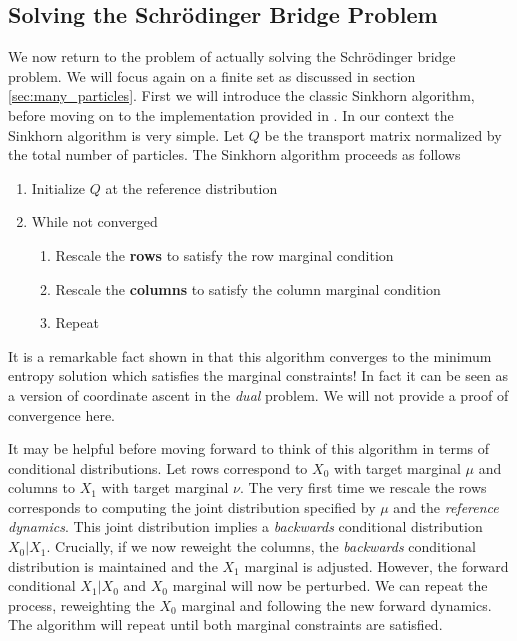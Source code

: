 \documentclass{article}
\begin{document}
\subsection{Solving the Schrödinger Bridge Problem}
We now return to the problem of actually solving the Schrödinger bridge problem.
We will focus again on a finite set as discussed in section
\ref{sec:many_particles}. First we will introduce the classic
Sinkhorn algorithm, before moving on to the implementation provided in 
\cite{debortoli2023diffusionschrodingerbridgeapplications}. In our context
the Sinkhorn algorithm is very simple. Let $Q$ be the transport matrix
normalized by the total number of particles. The Sinkhorn algorithm proceeds
as follows
\begin{enumerate}
    \item Initialize $Q$ at the reference distribution
    \item While not converged
    \begin{enumerate}
        \item Rescale the \textbf{rows} to satisfy the row marginal condition
        \item Rescale the \textbf{columns} to satisfy the column marginal condition
        \item Repeat
    \end{enumerate}
\end{enumerate}
It is a remarkable fact shown in \cite{Sinkhorn1964} that this algorithm
converges to the minimum entropy solution which satisfies the marginal
constraints! In fact it can be seen as a version of coordinate ascent in the
\emph{dual} problem. We will not provide a proof of convergence here.

It may be helpful before moving forward to think of this algorithm in terms of
conditional distributions. Let rows correspond to
$X_0$ with target marginal $\mu$ and columns to $X_1$ with target marginal
$\nu$. The very first time we rescale the rows corresponds to computing the joint
distribution specified by $\mu$ and the \emph{reference dynamics}. This joint
distribution implies a \emph{backwards} conditional distribution $X_0|X_1$.
Crucially, if we now reweight the columns, the \emph{backwards} conditional distribution
is maintained and the $X_1$ marginal is adjusted. However, the forward
conditional $X_1 | X_0$ and $X_0$ marginal will now be perturbed. We can
repeat the process, reweighting the $X_0$ marginal and following the new
forward dynamics. The algorithm
will repeat until both marginal constraints are satisfied.
\end{document}
